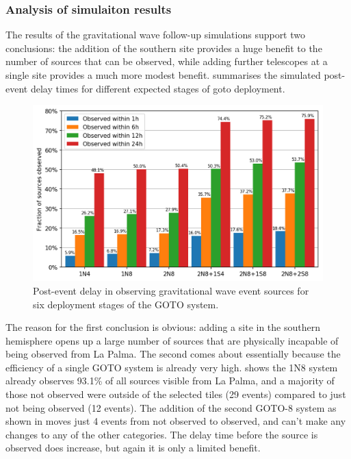 \begin{colsection}
\begin{colsection}
\subsubsection{Analysis of simulaiton results}

The results of the gravitational wave follow-up simulations support two conclusions: the addition of the southern site provides a huge benefit to the number of sources that can be observed, while adding further telescopes at a single site provides a much more modest benefit.  summarises the simulated post-event delay times for different expected stages of \gls{goto} deployment.

\begin{figure}[t]
\begin{center}
\includegraphics[width=\linewidth]{images/gw_sims/results.png}
\end{center}
\caption[Simulation delay time for different GOTO systems]{Post-event delay in observing gravitational wave event sources for six deployment stages of the GOTO system.
}
\label{fig:sim_results}
\end{figure}

The reason for the first conclusion is obvious: adding a site in the southern hemisphere opens up a large number of sources that are physically incapable of being observed from La Palma. The second comes about essentially because the efficiency of a single GOTO system is already very high.  shows the 1N8 system already observes 93.1\% of all sources visible from La Palma, and a majority of those not observed were outside of the selected tiles (29 events) compared to just not being observed (12 events). The addition of the second GOTO-8 system as shown in  moves just 4 events from not observed to observed, and can't make any changes to any of the other categories. The delay time before the source is observed does increase, but again it is only a limited benefit.


\end{colsection}
\end{colsection}
